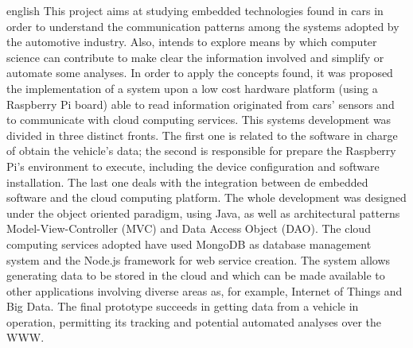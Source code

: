 \begin{resumo}[ABSTRACT]
 \begin{otherlanguage*}{english}
   This project aims at studying embedded technologies found in cars in order to understand the communication patterns among the systems adopted by the automotive industry. Also, intends to explore means by which computer science can contribute to make clear the information involved and simplify or automate some analyses. In order to apply the concepts found, it was proposed the implementation of a system upon a low cost hardware platform (using a Raspberry Pi board) able to read information originated from cars’ sensors and to communicate with cloud computing services. This systems development was divided in three distinct fronts. The first one is related to the software in charge of obtain the vehicle's data; the second is responsible for prepare the Raspberry Pi's environment to execute, including the device configuration and software installation. The last one deals with the integration between de embedded software and the cloud computing platform. The whole development was designed under the object oriented paradigm, using Java, as well as architectural patterns Model-View-Controller (MVC) and Data Access Object (DAO). The cloud computing services adopted have used MongoDB as database management system and the Node.js framework for web service creation. The system allows generating data to be stored in the cloud and which can be made available to other applications involving diverse areas as, for example, Internet of Things and Big Data. The final prototype succeeds in getting data from a vehicle in operation, permitting its tracking and potential automated analyses over the WWW. 

 \end{otherlanguage*}
\end{resumo}